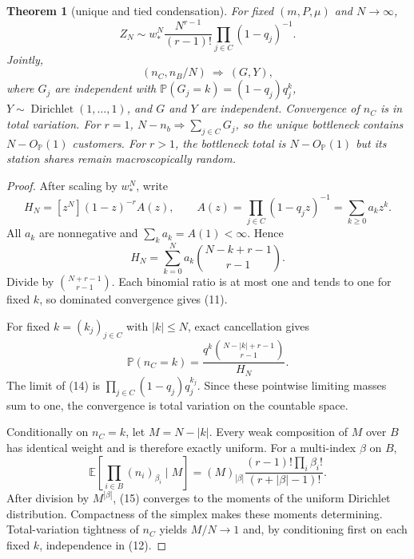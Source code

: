 \documentclass[10pt]{article}
\newtheorem{theorem}{Theorem}
\newcommand{\E}{\mathbb E}
\newcommand{\Pp}{\mathbb P}
\newcommand{\Dir}{\operatorname{Dirichlet}}
\begin{document}
\begin{theorem}[unique and tied condensation]\label{thm:condensation}
For fixed $(m,P,\mu)$ and $N\to\infty$,
\begin{equation}
 Z_N\sim w_*^N\frac{N^{r-1}}{(r-1)!}
       \prod_{j\in C}(1-q_j)^{-1}.                       \tag{11}
\end{equation}
Jointly,
\begin{equation}
 (n_C,n_B/N)\ \Longrightarrow\ (G,Y),                   \tag{12}
\end{equation}
where $G_j$ are independent with
$\Pp(G_j=k)=(1-q_j)q_j^k$, $Y\sim\Dir(1,\ldots,1)$,
and $G$ and $Y$ are independent.  Convergence of $n_C$ is in total variation.
For $r=1$, $N-n_b\Rightarrow\sum_{j\in C}G_j$, so the unique bottleneck
contains $N-O_{\Pp}(1)$ customers.  For $r>1$, the bottleneck total is
$N-O_{\Pp}(1)$ but its station shares remain macroscopically random.
\end{theorem}

\begin{proof}
After scaling by $w_*^N$, write
\[
 H_N=[z^N](1-z)^{-r}A(z),\qquad
 A(z)=\prod_{j\in C}(1-q_jz)^{-1}=\sum_{k\geq0}a_kz^k.
\]
All $a_k$ are nonnegative and $\sum_ka_k=A(1)<\infty$.  Hence
\begin{equation}
 H_N=\sum_{k=0}^Na_k\binom{N-k+r-1}{r-1}.                 \tag{13}
\end{equation}
Divide by $\binom{N+r-1}{r-1}$.  Each binomial ratio is at most one and
tends to one for fixed $k$, so dominated convergence gives (11).

For fixed $k=(k_j)_{j\in C}$ with $|k|\leq N$, exact cancellation gives
\begin{equation}
 \Pp(n_C=k)=
 \frac{q^k\binom{N-|k|+r-1}{r-1}}{H_N}.                  \tag{14}
\end{equation}
The limit of (14) is $\prod_{j\in C}(1-q_j)q_j^{k_j}$.
Since these pointwise limiting masses sum to one, the convergence is total
variation on the countable space.

Conditionally on $n_C=k$, let $M=N-|k|$.  Every weak composition of $M$
over $B$ has identical weight and is therefore exactly uniform.  For a
multi-index $\beta$ on $B$,
\begin{equation}
 \E\!\left[\prod_{i\in B}(n_i)_{\beta_i}\mid M\right]
 =(M)_{|\beta|}\frac{(r-1)!\prod_i\beta_i!}
 {(r+|\beta|-1)!}.                                       \tag{15}
\end{equation}
After division by $M^{|\beta|}$, (15) converges to the moments of the uniform
Dirichlet distribution.  Compactness of the simplex makes these moments
determining.  Total-variation tightness of $n_C$ yields $M/N\to1$ and, by
conditioning first on each fixed $k$, independence in (12).
\end{proof}
\end{document}
